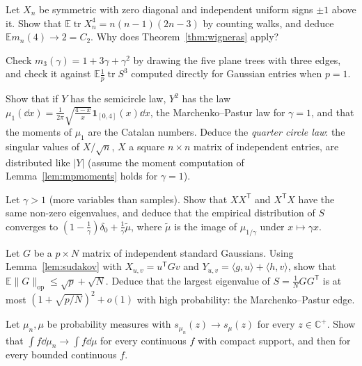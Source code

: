 \begin{exercise}[$\star$]\label{ex:pmone}
Let $X_n$ be symmetric with zero diagonal and independent uniform signs $\pm1$ above it. Show that $\mathbb E\operatorname{tr}X_n^4=n(n-1)(2n-3)$ by counting walks, and deduce $\mathbb Em_n(4)\to2=C_2$. Why does Theorem~\ref{thm:wigneras} apply?
\end{exercise}

\begin{exercise}[$\star$]\label{ex:mpsmall}
Check $m_3(\gamma)=1+3\gamma+\gamma^2$ by drawing the five plane trees with three edges, and check it against $\mathbb E\frac1p\operatorname{tr}S^3$ computed directly for Gaussian entries when $p=1$.
\end{exercise}

\begin{exercise}[$\star\star$]\label{ex:quartercircle}
Show that if $Y$ has the semicircle law, $Y^2$ has the law $\mu_1(\dd x)=\frac1{2\pi}\sqrt{\frac{4-x}x}\mathbf 1_{[0,4]}(x)\dd x$, the Marchenko--Pastur law for $\gamma=1$, and that the moments of $\mu_1$ are the Catalan numbers. Deduce the
\emph{quarter circle law}: the singular values of $X/\sqrt n$, $X$ a square $n\times n$ matrix of independent entries, are distributed like $|Y|$ (assume the moment computation of Lemma~\ref{lem:mpmoments} holds for $\gamma=1$).
\end{exercise}

\begin{exercise}[$\star\star$]\label{ex:wide}
Let $\gamma>1$ (more variables than samples). Show that $XX^{\mathsf T}$ and $X^{\mathsf T}X$ have the same non-zero eigenvalues, and deduce that the empirical distribution of $S$ converges to
$(1-\frac1\gamma)\delta_0+\frac1\gamma\tilde\mu$, where $\tilde\mu$ is the image of $\mu_{1/\gamma}$ under $x\mapsto\gamma x$.
\end{exercise}

\begin{exercise}[$\star\star$]\label{ex:gordon}
Let $G$ be a $p\times N$ matrix of independent standard Gaussians. Using Lemma~\ref{lem:sudakov} with $X_{u,v}=u^{\mathsf T}Gv$ and $Y_{u,v}=\langle g,u\rangle+\langle h,v\rangle$, show that $\mathbb E\|G\|_{\mathrm{op}}\le\sqrt p+\sqrt N$. Deduce that the
largest eigenvalue of $S=\frac1NGG^{\mathsf T}$ is at most $(1+\sqrt{p/N})^2+o(1)$ with high probability: the Marchenko--Pastur edge.
\end{exercise}

\begin{exercise}[$\star\star$]\label{ex:stieltjesconv}
Let $\mu_n,\mu$ be probability measures with $s_{\mu_n}(z)\to s_\mu(z)$ for every $z\in\mathbb C^+$. Show that $\int f\dd\mu_n\to\int f\dd\mu$ for every continuous $f$ with compact support, and then for every bounded continuous $f$.
\end{exercise}

